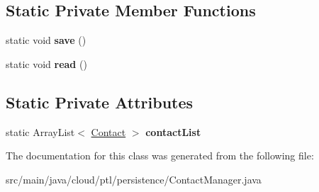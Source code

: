 \subsection*{Static Private Member Functions}
\begin{DoxyCompactItemize}
\item 
\mbox{\label{classcloud_1_1ptl_1_1persistence_1_1ContactManager_a355c2df57a31d2e4c7dc42d697d64c50}} 
static void {\bfseries save} ()
\item 
\mbox{\label{classcloud_1_1ptl_1_1persistence_1_1ContactManager_a4c1f68a230573a4f2842139b46e3c8d9}} 
static void {\bfseries read} ()
\end{DoxyCompactItemize}
\subsection*{Static Private Attributes}
\begin{DoxyCompactItemize}
\item 
\mbox{\label{classcloud_1_1ptl_1_1persistence_1_1ContactManager_a6d025a6c5e6db2c3cae3df59056b94e7}} 
static Array\+List$<$ \hyperlink{classcloud_1_1ptl_1_1persistence_1_1Contact}{Contact} $>$ {\bfseries contact\+List}
\end{DoxyCompactItemize}


The documentation for this class was generated from the following file\+:\begin{DoxyCompactItemize}
\item 
src/main/java/cloud/ptl/persistence/Contact\+Manager.\+java\end{DoxyCompactItemize}
